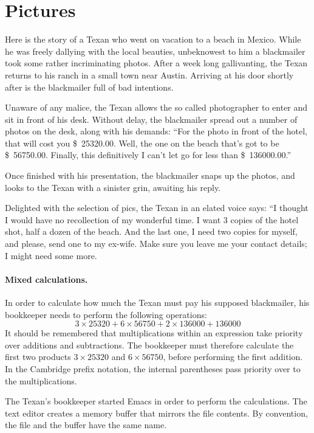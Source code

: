 \documentclass[a4paper,12pt]{book}
\begin{document}
\section{Pictures}
Here is the story of a Texan who went on
vacation to a beach in Mexico. While he was
freely dallying with the local beauties,
unbeknowest to him a blackmailer took some
rather incriminating photos.
After a week long gallivanting, the Texan
returns to his ranch in a small town near Austin.
Arriving at his door shortly after is the blackmailer
full of bad intentions.

Unaware of any malice, the Texan allows the so
called photographer to enter and sit in front
of his desk. Without delay, the blackmailer spread
out a number of photos on the desk, along with his
demands: “For the photo in front of the hotel,
that will cost you \$~25320.00. Well, the one
on the beach that's got to be \$~56750.00.
Finally, this definitively I can't let
go for less than \$~136000.00.”

Once finished with his presentation,
the blackmailer snaps up the photos,
and looks to the Texan with a sinister
grin, awaiting his reply.

Delighted with the selection of pics,
the Texan in an elated voice says:
“I thought I would have no recollection
of my wonderful time. I want 3 copies
of the hotel shot, half a dozen of the beach.
And the last one, I need two copies for myself,
and please, send one to my ex-wife.
Make sure you leave me your contact
details; I might need some more.

\paragraph{Mixed calculations.}
In order to calculate how much the
Texan must pay his supposed blackmailer,
his bookkeeper needs to perform the
following operations:
$$3\times 25320+6\times 56750 + 2\times 136000+136000$$
It should be remembered that multiplications
within an expression take priority over additions
and subtractions. The bookkeeper must therefore
calculate the first two products $3\times 25320$
and $6\times 56750$, before performing the first
addition. In the Cambridge prefix notation,
the internal parentheses pass priority over
to the multiplications.

The Texan's bookkeeper started Emacs
in order to perform the calculations.
The text editor creates a memory
buffer that mirrors the file contents.
By convention, the file and the buffer
have the same name.
\end{document}
